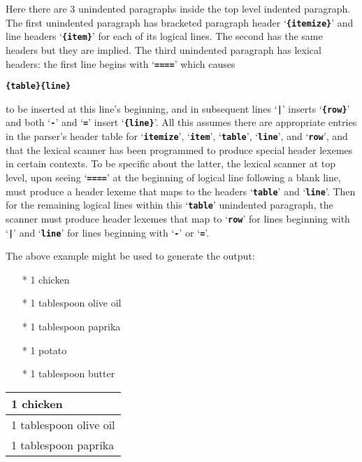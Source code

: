 \documentclass[12pt]{article}
\newcommand{\TT}[1]{{\tt \bfseries #1}}
\newcommand{\EOL}{\penalty \exhyphenpenalty}
\newenvironment{indpar}[1][0.3in]%
	{\begin{list}{}%
		     {\setlength{\itemsep}{0in}%
		      \setlength{\topsep}{0in}%
		      \setlength{\parsep}{1ex}%
		      \setlength{\labelwidth}{#1}%
		      \setlength{\leftmargin}{#1}%
		      \addtolength{\leftmargin}{\labelsep}}%
	 \item}%
	{\end{list}}
\begin{document}
Here there are 3 unindented paragraphs inside the top level indented
paragraph.  The first unindented paragraph has bracketed
paragraph header `\TT{\{itemize\}}' and line headers `\TT{\{item\}}'
for each of its logical lines.  The second has the same headers but
they are implied.  The third unindented paragraph has lexical headers:
the first line begins with `\TT{====}' which causes
\begin{center}
\TT{\{table\}\EOL\{line\}}
\end{center}
to be inserted at this line's beginning,
and in subsequent lines `\TT{|}' inserts `\TT{\{row\}}'
and both `\TT{-}' and `\TT{=}' insert `\TT{\{line\}}'.
All this assumes there are appropriate entries in the parser's
header table for `\TT{itemize}', `\TT{item}', `\TT{table}',
`\TT{line}', and `\TT{row}', and that the lexical scanner has
been programmed to produce special header lexemes in certain
contexts.  To be specific about the latter, the lexical scanner
at top level, upon seeing `\TT{====}' at the beginning of logical
line following a blank line,
must produce a header lexeme that maps
to the headers `\TT{table}' and `\TT{line}'.
Then for the remaining logical lines within this
`\TT{table}' unindented paragraph, the scanner must
produce header lexemes that map to
`\TT{row}' for lines beginning with `\TT{|}' and
`\TT{line}' for lines beginning with `\TT{-}' or `\TT{=}'.

The above example might be used to generate the output:

\begin{indpar}
\begin{indpar}[5em]
\begin{itemize}
\item[*] 1 chicken
\item[*] 1 tablespoon olive oil
\item[*] 1 tablespoon paprika
\end{itemize}
\end{indpar}

\begin{indpar}[5em]
\begin{itemize}
\item[*] 1 potato
\item[*] 1 tablespoon butter
\end{itemize}
\end{indpar}

\begin{tabular}{|l|}
\hline\hline
1 chicken
\\\hline
1 tablespoon olive oil
\\\hline
1 tablespoon paprika
\\\hline\hline
\end{tabular}

\end{indpar}
\end{document}

